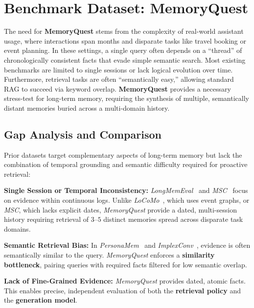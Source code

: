 \section{Benchmark Dataset: MemoryQuest}
\label{sec:dataset}

The need for \textbf{MemoryQuest} stems from the complexity of real-world assistant usage, where interactions span months and disparate tasks like travel booking or event planning. In these settings, a single query often depends on a ``thread'' of chronologically consistent facts that evade simple semantic search. Most existing benchmarks are limited to single sessions or lack logical evolution over time. Furthermore, retrieval tasks are often ``semantically easy,'' allowing standard RAG to succeed via keyword overlap. \textbf{MemoryQuest} provides a necessary stress-test for long-term memory, requiring the synthesis of multiple, semantically distant memories buried across a multi-domain history.


\subsection{Gap Analysis and Comparison}
Prior datasets target complementary aspects of long-term memory but lack the combination of temporal grounding and semantic difficulty required for proactive retrieval:

\squishlist
    \item \textbf{Single Session or Temporal Inconsistency:} \emph{LongMemEval}~\cite{wu2024longmemevalbenchmarkingchatassistants} and \emph{MSC}~\cite{xu-etal-2022-beyond} focus on evidence within continuous logs. Unlike \emph{LoCoMo}~\cite{maharana2024evaluating}, which uses event graphs, or \emph{MSC}, which lacks explicit dates, \emph{MemoryQuest} provide a dated, multi-session history requiring retrieval of $3$--$5$ distinct memories spread across disparate task domains.
    \item \textbf{Semantic Retrieval Bias:} In \emph{PersonaMem}~\cite{jiang2025personamem} and \emph{ImplexConv}~\cite{li2025implexconv}, evidence is often semantically similar to the query. \emph{MemoryQuest} enforces a \textbf{similarity bottleneck}, pairing queries with required facts filtered for low semantic overlap.
    \item \textbf{Lack of Fine-Grained Evidence:} \emph{MemoryQuest} provides dated, atomic facts. This enables precise, independent evaluation of both the \textbf{retrieval policy} and the \textbf{generation model}.
\squishend


